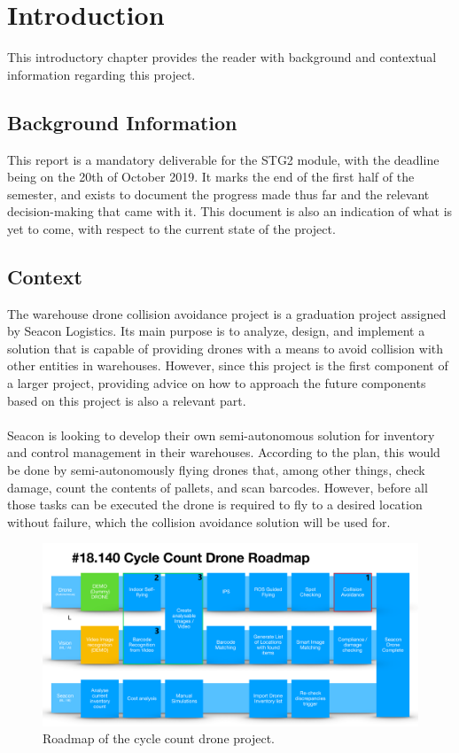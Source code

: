 \chapter{Introduction}
\label{ch:introduction}

This introductory chapter provides the reader with background and contextual information regarding this project.

\section{Background Information}
\label{sec:background}
This report is a mandatory deliverable for the \gls{STG2} module, with the deadline being on the 20th of October 2019. It marks the end of the first half of the semester, and exists to document the progress made thus far and the relevant decision-making that came with it. This document is also an indication of what is yet to come, with respect to the current state of the project.

\section{Context}
\label{sec:context}
The warehouse drone collision avoidance project is a graduation project assigned by Seacon Logistics. Its main purpose is to analyze, design, and implement a solution that is capable of providing drones with a means to avoid collision with other entities in warehouses. However, since this project is the first component of a larger project, providing advice on how to approach the future components based on this project is also a relevant part.
\\\\
Seacon is looking to develop their own semi-autonomous solution for inventory and control management in their warehouses. According to the plan, this would be done by semi-autonomously flying drones that, among other things, check damage, count the contents of pallets, and scan barcodes. However, before all those tasks can be executed the drone is required to fly to a desired location without failure, which the collision avoidance solution will be used for.
\begin{figure}[ht]
	\centering
	\includegraphics[width=\linewidth]{img/seacon_roadmap.png}
	\caption{Roadmap of the cycle count drone project.}
	\label{fig:roadmap}
\end{figure}
\pagebreak

